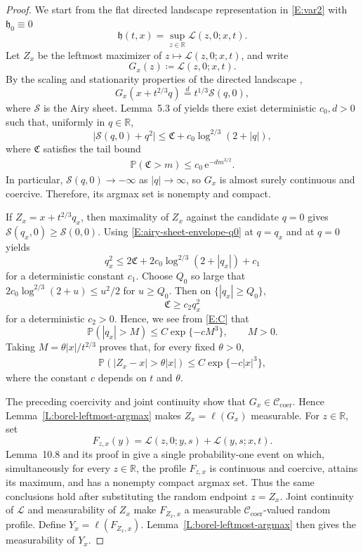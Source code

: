 \documentclass[12pt, reqno]{amsart}
\numberwithin{equation}{section}
\theoremstyle{definition}
\newcommand{\R}{\mathbb{R}}
\newcommand{\h}{\mathfrak{h}}
\newcommand{\Prob}{\mathbb{P}}
\newcommand{\e}{\,\mathrm{e}}
\newcommand{\Lcal}{\mathcal{L}}
\begin{document}
\begin{proof}
  We start from the flat directed landscape representation in \eqref{E:var2}
  with $\h_0\equiv0$
  \[
    \h(t,x)=\sup_{z\in \R}\Lcal(z,0;x,t).
  \]
  Let $Z_x$ be the leftmost maximizer of $z\mapsto\Lcal(z,0;x,t)$, and write
  \[
    G_x(z) \coloneqq \Lcal(z,0;x,t).
  \]
  By the scaling and stationarity properties of the directed landscape
  \cite[Lemma~10.2]{dauvergne.ortmann.ea:22:directed},
  \[
    G_x(x+t^{2/3}q)\stackrel{d}=t^{1/3}\mathcal S(q,0),
  \]
  where $\mathcal S$ is the Airy sheet.  Lemma~5.3 of
  \cite{dauvergne.sarkar.ea:22:three-halves} yields there exist deterministic
  $c_0, d>0$ such that, uniformly in $q\in\R$,
  \begin{equation}
    \bigl|\mathcal S(q,0)+q^2\bigr|
    \le \mathfrak C+c_0\log^{2/3}(2+|q|),
    \label{E:airy-sheet-envelope-q0}
  \end{equation}
  where $\mathfrak C$ satisfies the tail bound
  \begin{align}\label{E:C}
  \Prob(\mathfrak C>m)\leq c_0\e^{-d m^{3/2}}.
  \end{align}
 In particular, $\mathcal S(q,0)\to-\infty$ as $|q|\to\infty$, so $G_x$ is
 almost surely continuous and coercive. Therefore, its argmax set is nonempty
 and compact.

  If $Z_x=x+t^{2/3}q_x$, then maximality of $Z_x$ against the candidate $q=0$
  gives $\mathcal S(q_x,0)\ge \mathcal S(0,0)$.  Using
  \eqref{E:airy-sheet-envelope-q0} at $q=q_x$ and at $q=0$ yields
  \[
    q_x^2
    \le 2\mathfrak C + 2c_0\log^{2/3}(2+|q_x|)+c_1
  \]
  for a deterministic constant $c_1$.  Choose $Q_0$ so large that
  $2c_0\log^{2/3}(2+u)\le u^2/2$ for $u\ge Q_0$.  Then on $\{|q_x|\ge Q_0\}$,
  \[
    \mathfrak C\ge c_2 q_x^2
  \]
  for a deterministic $c_2>0$.   Hence, we see from \eqref{E:C} that 
  \[
    \Prob(|q_x|>M)
    \le C\exp\{-c M^3\},
    \qquad M>0.
  \]
  Taking $M=\theta |x|/t^{2/3}$ proves that, for every fixed $\theta>0$,
  \begin{align}\label{E:Zx}
    \Prob(|Z_x-x|>\theta |x|)
    \le C\exp\{-c |x|^3\},
  \end{align}
  where the constant $c$ depends on $t$ and $\theta$.

  The preceding coercivity and joint continuity show that
  $G_x\in\mathcal C_{\mathrm{coer}}$. Hence
  Lemma~\ref{L:borel-leftmost-argmax} makes $Z_x=\ell(G_x)$ measurable.
  For $z\in\R$, set
  \[
    F_{z,x}(y)=\Lcal(z,0;y,s)+\Lcal(y,s;x,t).
  \]
  Lemma~10.8 and its proof in
  \cite{dauvergne.ortmann.ea:22:directed} give a single probability-one event on
  which, simultaneously for every $z\in\R$, the profile $F_{z,x}$ is continuous
  and coercive, attains its maximum, and has a nonempty compact argmax set. Thus
  the same conclusions hold after substituting the random endpoint $z=Z_x$.
  Joint continuity of $\Lcal$ and measurability of $Z_x$ make $F_{Z_x,x}$ a
  measurable $\mathcal C_{\mathrm{coer}}$-valued random profile. Define
  $Y_x=\ell(F_{Z_x,x})$. Lemma~\ref{L:borel-leftmost-argmax} then gives the
  measurability of $Y_x$.


\end{proof}
\end{document}
